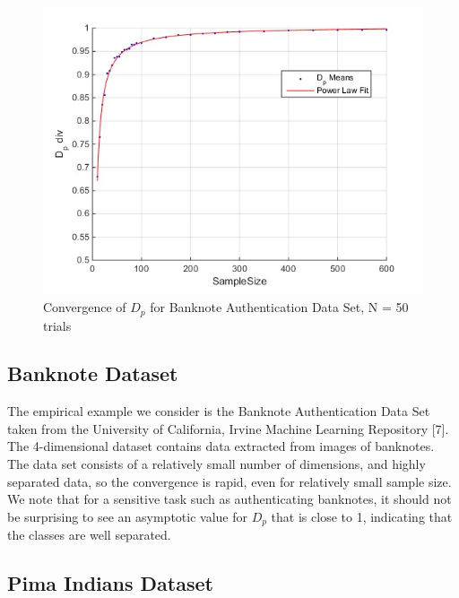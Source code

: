 \documentclass{article}
\begin{document}
	
	\newpage
	\begin{figure}[h!]
		\caption{Convergence of $D_p$ for Banknote Authentication Data Set, N = 50 trials}
		\centering
		\includegraphics[scale=0.6]{dp_n50_banknote}
	\end{figure}
	
	\newpage
	\subsection*{\small Banknote Dataset}
	The empirical example we consider is the Banknote Authentication Data Set taken from the University of California, Irvine Machine Learning Repository [7]. The 4-dimensional dataset contains data extracted from images of banknotes. The data set consists of a relatively small number of dimensions, and highly separated data, so the convergence is rapid, even for relatively small sample size. We note that for a sensitive task such as authenticating banknotes, it should not be surprising to see an asymptotic value for $D_p$ that is close to 1, indicating that the classes are well separated.  
	
	\newpage
	\subsection*{\small Pima Indians Dataset}
	
\end{document}
